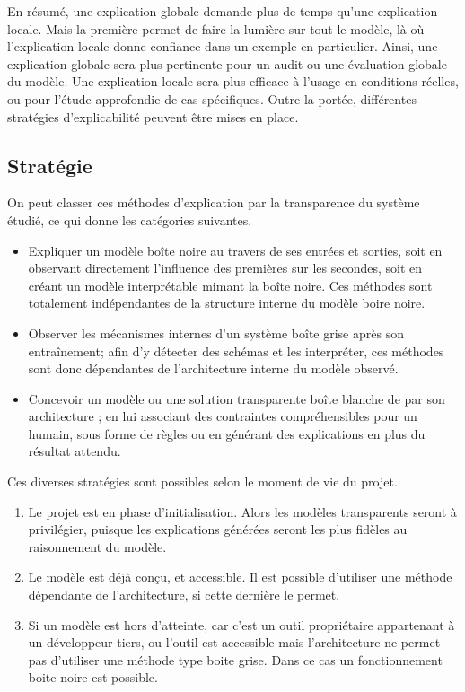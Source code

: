 En résumé, une explication globale demande plus de temps qu'une explication locale. Mais la première permet de faire la lumière sur tout le modèle, là où l'explication locale donne confiance dans un exemple en particulier. Ainsi, une explication globale sera plus pertinente pour un audit ou une évaluation globale du modèle. Une explication locale sera plus efficace à l'usage en conditions réelles, ou pour l'étude approfondie de cas spécifiques. Outre la portée, différentes stratégies d'explicabilité peuvent être mises en place.

\subsection{Stratégie}

On peut classer ces méthodes d'explication par la transparence du système étudié, ce qui donne les catégories suivantes.
\begin{itemize}
    \item Expliquer un modèle boîte noire au travers de ses entrées et sorties, soit en observant directement l'influence des premières sur les secondes, soit en créant un modèle interprétable mimant la boîte noire. Ces méthodes sont totalement indépendantes de la structure interne du modèle boire noire.
    \item Observer les mécanismes internes d'un système boîte grise après son entraînement; afin d'y détecter des schémas et les interpréter, ces méthodes sont donc dépendantes de l'architecture interne du modèle observé.
    \item Concevoir un modèle ou une solution transparente boîte blanche de par son architecture ; en lui associant des contraintes compréhensibles pour un humain, sous forme de règles ou en générant des explications en plus du résultat attendu.
\end{itemize}

Ces diverses stratégies sont possibles selon le moment de vie du projet.
\begin{enumerate}
    \item Le projet est en phase d'initialisation. Alors les modèles transparents seront à privilégier, puisque les explications générées seront les plus fidèles au raisonnement du modèle.
    \item Le modèle est déjà conçu, et accessible. Il est possible d'utiliser une méthode dépendante de l'architecture, si cette dernière le permet.
    \item Si un modèle est hors d'atteinte, car c'est un outil propriétaire appartenant à un développeur tiers, ou l'outil est accessible mais l'architecture ne permet pas d'utiliser une méthode type boite grise. Dans ce cas un fonctionnement boite noire est possible.
\end{enumerate}

